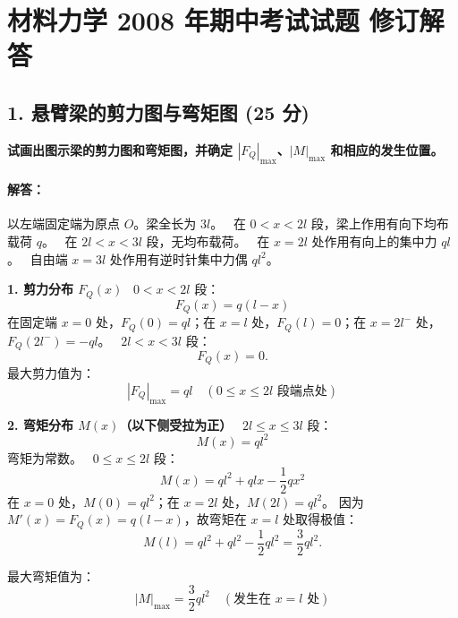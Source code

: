 \documentclass[11pt,a4paper]{ctexrep}
\begin{document}
\chapter{材料力学 2008 年期中考试试题 修订解答}
{



\section*{1. 悬臂梁的剪力图与弯矩图 (25 分)}

\textbf{试画出图示梁的剪力图和弯矩图，并确定 $|F_Q|_{\max}$、$|M|_{\max}$ 和相应的发生位置。}

\subsubsection*{解答：}

以左端固定端为原点 $O$。梁全长为 $3l$。
\noindent\textbullet\ 在 $0 < x < 2l$ 段，梁上作用有向下均布载荷 $q$。
\noindent\textbullet\ 在 $2l < x < 3l$ 段，无均布载荷。
\noindent\textbullet\ 在 $x=2l$ 处作用有向上的集中力 $ql$。
\noindent\textbullet\ 自由端 $x=3l$ 处作用有逆时针集中力偶 $ql^2$。

\textbf{1. 剪力分布 $F_Q(x)$}
\noindent\textbullet\ $0 < x < 2l$ 段：
  \[
  F_Q(x) = q(l-x)
  \]
  在固定端 $x=0$ 处，$F_Q(0)=ql$；在 $x=l$ 处，$F_Q(l)=0$；在 $x=2l^-$ 处，$F_Q(2l^-)=-ql$。
\noindent\textbullet\ $2l < x < 3l$ 段：
  \[
  F_Q(x) = 0 .
  \]
最大剪力值为：
\[
|F_Q|_{\max} = ql \quad (0\le x\le 2l \text{ 段端点处})
\]

\textbf{2. 弯矩分布 $M(x)$（以下侧受拉为正）}
\noindent\textbullet\ $2l \le x \le 3l$ 段：
  \[
  M(x) = ql^2
  \]
  弯矩为常数。
\noindent\textbullet\ $0 \le x \le 2l$ 段：
  \[
  M(x) = ql^2 + qlx - \frac{1}{2}qx^2
  \]
  在 $x=0$ 处，$M(0)=ql^2$；在 $x=2l$ 处，$M(2l)=ql^2$。
  因为 $M'(x)=F_Q(x)=q(l-x)$，故弯矩在 $x=l$ 处取得极值：
  \[
  M(l)=ql^2+ql^2-\frac12ql^2=\frac32ql^2.
  \]

最大弯矩值为：
\[
|M|_{\max} = \frac32ql^2 \quad (\text{发生在 } x=l \text{ 处})
\]

\begin{figure}[H]
\centering
{}
\end{figure}}
\end{document}
